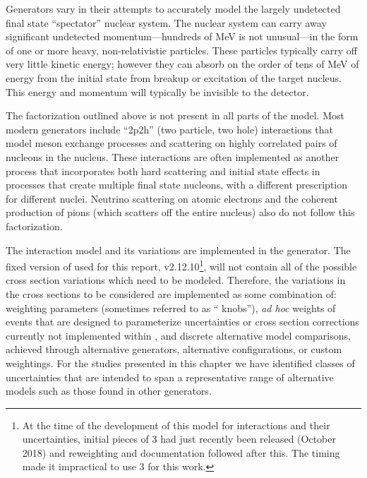 Generators vary in their attempts to accurately model the largely undetected final state ``spectator'' nuclear system.  The nuclear system can carry away significant undetected momentum---hundreds of MeV is not unusual---in the form of one or more heavy, non-relativistic particles.  These particles typically carry off very little kinetic energy; however they can absorb on the order of tens of MeV of energy from the initial state from breakup or excitation of the target nucleus.  This energy and momentum will typically be invisible to the detector.

The factorization outlined above is not present in all parts of the model.  Most modern generators include ``2p2h'' (two particle, two hole) interactions that model meson exchange processes and scattering on highly correlated pairs of nucleons in the nucleus.  These interactions are often implemented as another process that incorporates both hard scattering and initial state effects in processes that create multiple final state nucleons, with a different prescription for different nuclei.
Neutrino scattering on atomic electrons and the coherent production of pions (which scatters off the entire nucleus) also
do not follow this factorization.

The interaction model and its variations are implemented in the   generator.  The fixed version of  used for this report, v2.12.10\footnote{At the time of the development of this model for interactions and their uncertainties, initial pieces of  3 had just recently been released (October 2018) and reweighting and documentation followed after this. The timing made it impractical to use  3 for this work.}, will not contain all of the possible cross section variations which need to be modeled.  Therefore, the variations in the cross sections to be considered are implemented as some combination of:  weighting parameters (sometimes referred to as `` knobs''), {\em ad hoc} weights of events that are designed to parameterize uncertainties or cross section corrections currently not implemented within , and discrete alternative model comparisons, achieved through alternative generators, alternative  configurations, or custom weightings. For the studies presented in this chapter we have  identified classes of uncertainties that are intended to span a representative range of alternative models such as those found in other generators. %


